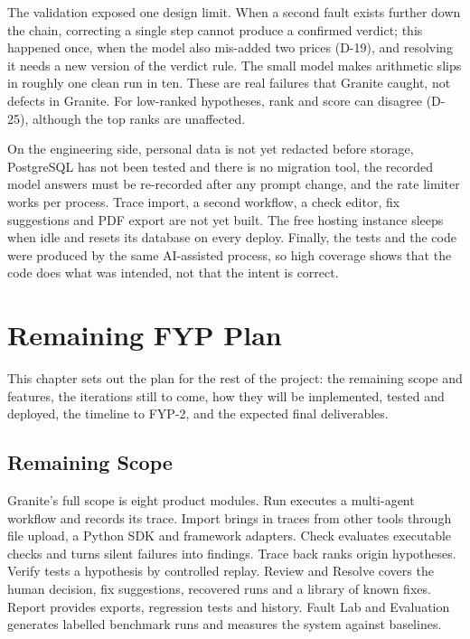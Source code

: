 \documentclass{fast-nuces-bs}
\begin{document}
The validation exposed one design limit. When a second fault exists further down the chain, correcting a single step cannot produce a confirmed verdict; this happened once, when the model also mis-added two prices (D-19), and resolving it needs a new version of the verdict rule. The small model makes arithmetic slips in roughly one clean run in ten. These are real failures that Granite caught, not defects in Granite. For low-ranked hypotheses, rank and score can disagree (D-25), although the top ranks are unaffected.

On the engineering side, personal data is not yet redacted before storage, PostgreSQL has not been tested and there is no migration tool, the recorded model answers must be re-recorded after any prompt change, and the rate limiter works per process. Trace import, a second workflow, a check editor, fix suggestions and PDF export are not yet built. The free hosting instance sleeps when idle and resets its database on every deploy. Finally, the tests and the code were produced by the same AI-assisted process, so high coverage shows that the code does what was intended, not that the intent is correct.

\chapter{Remaining FYP Plan}

This chapter sets out the plan for the rest of the project: the remaining scope and features, the iterations still to come, how they will be implemented, tested and deployed, the timeline to FYP-2, and the expected final deliverables.

\section{Remaining Scope}

Granite's full scope is eight product modules. Run executes a multi-agent workflow and records its trace. Import brings in traces from other tools through file upload, a Python SDK and framework adapters. Check evaluates executable checks and turns silent failures into findings. Trace back ranks origin hypotheses. Verify tests a hypothesis by controlled replay. Review and Resolve covers the human decision, fix suggestions, recovered runs and a library of known fixes. Report provides exports, regression tests and history. Fault Lab and Evaluation generates labelled benchmark runs and measures the system against baselines.
\end{document}
